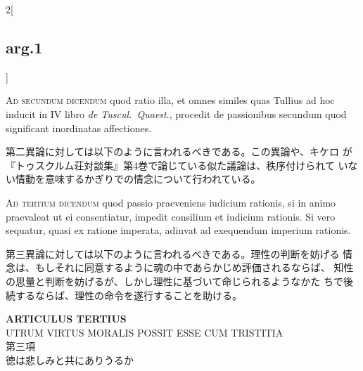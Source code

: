 \documentclass[paper=a4paper,fontsize=10pt,jafontsize=9pt,titlepage]{jlreq}
\begin{document}
\begin{paracol}{2}[\subsection{arg.1}]
\switchcolumn*[\subsection{ad.2}]

{\scshape Ad secundum dicendum} quod ratio illa, et omnes similes quas
Tullius ad hoc inducit in IV libro {\itshape de Tuscul.~Quaest}., procedit de
passionibus secundum quod significant inordinatas affectiones.

\switchcolumn

第二異論に対しては以下のように言われるべきである。この異論や、キケロ
 が『トゥスクルム荘対談集』第4巻で論じている似た議論は、秩序付けられて
 いない情動を意味するかぎりでの情念について行われている。

\switchcolumn*[\subsection{ad.3}]

{\scshape Ad tertium dicendum} quod passio praeveniens iudicium
rationis, si in animo praevaleat ut ei consentiatur, impedit consilium
et iudicium rationis. Si vero sequatur, quasi ex ratione imperata,
adiuvat ad exequendum imperium rationis.

\switchcolumn

第三異論に対しては以下のように言われるべきである。理性の判断を妨げる
 情念は、もしそれに同意するように魂の中であらかじめ評価されるならば、
 知性の思量と判断を妨げるが、しかし理性に基づいて命じられるようなかた
 ちで後続するならば、理性の命令を遂行することを助ける。

\end{paracol}
\newpage
{}
{}
\setcounter{section}{3}
\setcounter{subsection}{0}







\begin{center}
{\Large {\bfseries ARTICULUS TERTIUS}}\\
{\large UTRUM VIRTUS MORALIS POSSIT ESSE CUM TRISTITIA}\\
{\Large 第三項\\徳は悲しみと共にありうるか}
\end{center}
\end{document}
